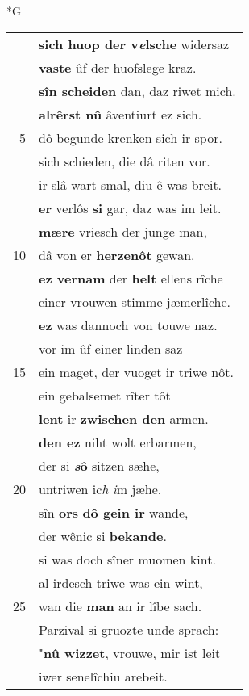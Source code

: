 \documentclass[8pt,a4paper,notitlepage]{article}
\begin{document}
\newpage
\begin{table}[ht]
\begin{minipage}[t]{0.5\linewidth}
\small
\begin{center}*G
\end{center}
\begin{tabular}{rl}
 & \textbf{sich huop der v\textit{e}lsche} widersaz\\ 
 & \textbf{vaste} ûf der huofslege kraz.\\ 
 & \textbf{sîn scheiden} dan, daz riwet mich.\\ 
 & \textbf{alrêrst nû} âventiurt ez sich.\\ 
5 & dô begunde krenken sich ir spor.\\ 
 & sich schieden, die dâ riten vor.\\ 
 & ir slâ wart smal, diu ê was breit.\\ 
 & \textbf{er} verlôs \textbf{si} gar, daz was im leit.\\ 
 & \textbf{mære} vriesch der junge man,\\ 
10 & dâ von er \textbf{herzenôt} gewan.\\ 
 & \textbf{ez vernam} der \textbf{helt} ellens rîche\\ 
 & einer vrouwen stimme jæmerlîche.\\ 
 & \textbf{ez} was dannoch von touwe naz.\\ 
 & vor im ûf einer linden saz\\ 
15 & ein maget, der vuoget ir triwe nôt.\\ 
 & ein gebalsemet rîter tôt\\ 
 & \textbf{lent} ir \textbf{zwischen den} armen.\\ 
 & \textbf{den ez} niht wolt erbarmen,\\ 
 & der si \textbf{\textit{s}ô} sitzen sæhe,\\ 
20 & untriwen ic\textit{h} \textit{i}m jæhe.\\ 
 & sîn \textbf{ors} \textbf{dô gein ir} wande,\\ 
 & der wênic si \textbf{bekande}.\\ 
 & si was doch sîner muomen kint.\\ 
 & al irdesch triwe was ein wint,\\ 
25 & wan die \textbf{man} an ir lîbe sach.\\ 
 & Parzival si gruozte unde sprach:\\ 
 & "\textbf{nû wizzet}, vrouwe, mir ist leit\\ 
 & iwer senelîchiu arebeit.\\ 

\end{tabular}
\end{minipage}
\end{table}
\end{document}
